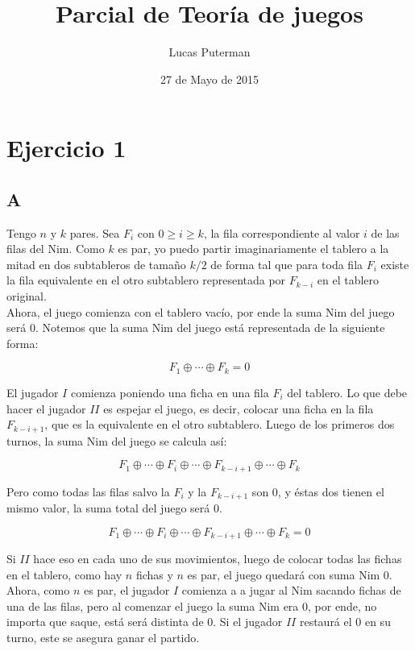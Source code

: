 \documentclass[a4paper]{article}
\title{Parcial de Teoría de juegos}
\author{Lucas Puterman}
\date{27 de Mayo de 2015}
\begin{document}
\maketitle


\section{Ejercicio 1}

\subsection{A}

Tengo $n$ y $k$ pares. Sea $F_{i}$ con $0 \geq i \geq k$, la fila correspondiente al valor $i$ de las filas del Nim. Como $k$ es par, yo puedo partir imaginariamente el tablero a la mitad en dos subtableros de tamaño $k/2$ de forma tal que para toda fila $F_{i}$ existe la fila equivalente en el otro subtablero representada por  $F_{k-i}$ en el tablero original.\\

Ahora, el juego comienza con el tablero vacío, por ende la suma Nim del juego será 0. Notemos que la suma Nim del juego está representada de la siguiente forma:

$$ F_{1} \oplus  \cdots \oplus F_{k}  = 0$$

El jugador $I$ comienza poniendo una ficha en una fila $F_{i}$ del tablero. Lo que debe hacer el jugador $II$ es espejar el juego, es decir, colocar una ficha en la fila $F_{k-i+1}$, que es la equivalente en el otro subtablero. Luego de los primeros dos turnos, la suma Nim del juego se calcula así:

$$ F_{1} \oplus  \cdots \oplus F_{i} \oplus  \cdots \oplus F_{k-i+1} \oplus  \cdots \oplus F_{k} $$

Pero como todas las filas salvo la $F_{i}$ y la $F_{k-i+1}$ son 0, y éstas dos tienen el mismo valor, la suma total del juego será 0. 

$$ F_{1} \oplus  \cdots \oplus F_{i} \oplus  \cdots \oplus F_{k-i+1} \oplus  \cdots \oplus F_{k}  = 0 $$

Si $II$ hace eso en cada uno de sus movimientos, luego de colocar todas las fichas en el tablero, como hay $n$ fichas y $n$ es par, el juego quedará con suma Nim 0.\\

Ahora, como $n$ es par, el jugador $I$ comienza a a jugar al Nim sacando fichas de una de las filas, pero al comenzar el juego la suma Nim era 0, por ende, no importa que saque, está será distinta de 0. Si el jugador $II$ restaurá el 0 en su turno, este se asegura ganar el partido.
\end{document}
